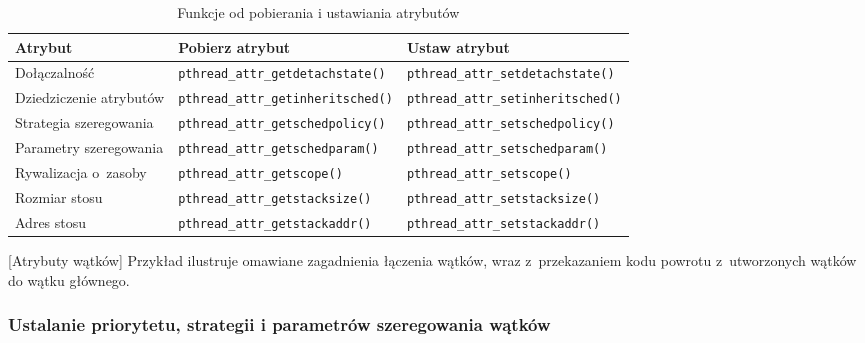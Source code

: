 \begin{table}[h!]
\centering
\caption{Funkcje od pobierania i ustawiania atrybutów}
\setlength{\arrayrulewidth}{1pt}
\setlength{\tabcolsep}{6pt}
\renewcommand{\arraystretch}{1.2}
\begin{tabular}{ |p{}|p{}|p{}| }
\hline \rowcolor{gray}
\textbf{Atrybut} & \textbf{Pobierz atrybut} & \textbf{Ustaw atrybut} \\ \hline
Dołączalność & \mbox{\lstinline[style=MyCStyle]{pthread_attr_getdetachstate()}} & \mbox{\lstinline[style=MyCStyle]{pthread_attr_setdetachstate()}} \\ \hline
Dziedziczenie atrybutów & \mbox{\lstinline[style=MyCStyle]{pthread_attr_getinheritsched()}} & \mbox{\lstinline[style=MyCStyle]{pthread_attr_setinheritsched()}} \\ \hline
Strategia szeregowania & \mbox{\lstinline[style=MyCStyle]{pthread_attr_getschedpolicy()}} & \mbox{\lstinline[style=MyCStyle]{pthread_attr_setschedpolicy()}} \\ \hline
Parametry szeregowania & \mbox{\lstinline[style=MyCStyle]{pthread_attr_getschedparam()}} & \mbox{\lstinline[style=MyCStyle]{pthread_attr_setschedparam()}} \\ \hline
Rywalizacja o~zasoby & \mbox{\lstinline[style=MyCStyle]{pthread_attr_getscope()}} & \mbox{\lstinline[style=MyCStyle]{pthread_attr_setscope()}} \\ \hline
Rozmiar stosu & \mbox{\lstinline[style=MyCStyle]{pthread_attr_getstacksize()}} & \mbox{\lstinline[style=MyCStyle]{pthread_attr_setstacksize()}} \\ \hline
Adres stosu & \mbox{\lstinline[style=MyCStyle]{pthread_attr_getstackaddr()}} & \mbox{\lstinline[style=MyCStyle]{pthread_attr_setstackaddr()}} \\ \hline
\end{tabular}
\label{tab:atrybuty2}
\end{table}


\begin{example}{[Atrybuty wątków]}
Przykład ilustruje omawiane zagadnienia łączenia wątków, wraz z~przekazaniem kodu powrotu z~utworzonych wątków do wątku głównego.


\end{example}

\subsubsection{Ustalanie priorytetu, strategii i parametrów szeregowania wątków}


